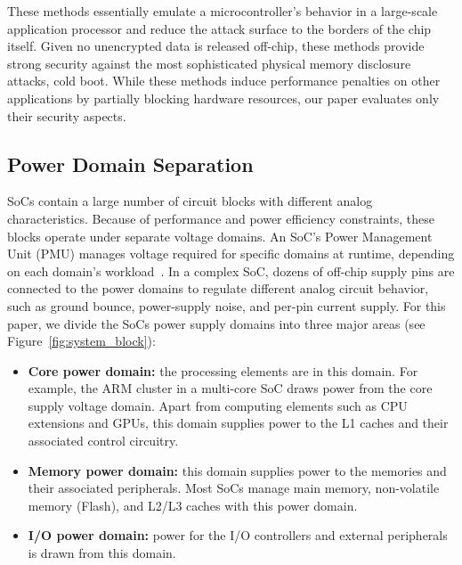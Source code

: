 These methods essentially emulate a microcontroller's behavior in a large-scale application processor and reduce the attack surface to the borders of the chip itself.
Given no unencrypted data is released off-chip, these methods provide strong security against the most sophisticated physical memory disclosure attacks, \eg cold boot.
While these methods induce performance penalties on other applications by partially blocking hardware resources, our paper evaluates only their security aspects.


\subsection{Power Domain Separation}
\label{sub_sec_power_domain}

SoCs contain a large number of circuit blocks with different analog characteristics.
Because of performance and power efficiency constraints, these blocks operate under separate voltage domains. 
An SoC's Power Management Unit (PMU) manages voltage required for specific domains at runtime, depending on each domain's workload~\cite{amelifard2009optimal}.
In a complex SoC, dozens of off-chip supply pins are connected to the power domains to regulate different analog circuit behavior, such as ground bounce, power-supply noise, and per-pin current supply.
For this paper, we divide the SoCs power supply domains into three major areas (see Figure~\ref{fig:system_block}):

\begin{itemize}
    \item \textbf{Core power domain:} the processing elements are in this domain. 
    For example, the ARM cluster in a multi-core SoC draws power from the core supply voltage domain. 
    Apart from computing elements such as CPU extensions and GPUs, this domain supplies power to the L1 caches and their associated control circuitry. 
    
    \item \textbf{Memory power domain:} this domain supplies power to the memories and their associated peripherals.
    Most SoCs manage main memory, non-volatile memory (\eg Flash), and L2/L3 caches with this power domain. 
    
    \item \textbf{I/O power domain:} power for the I/O controllers and external peripherals is drawn from this domain. 
\end{itemize}

